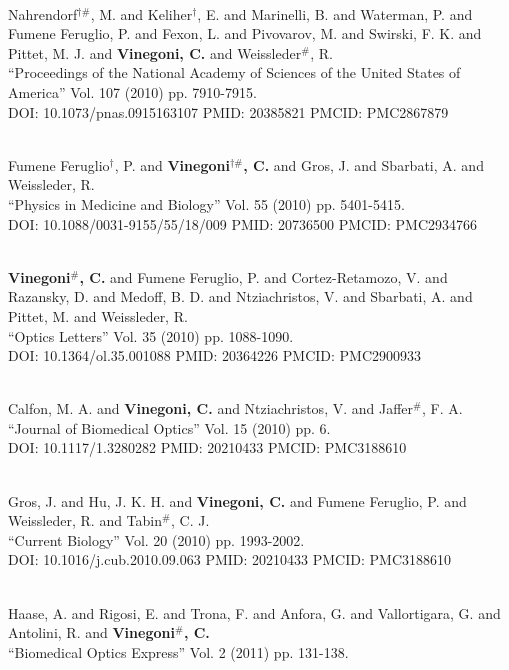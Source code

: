  \\ Nahrendorf$^{\dag \#}$, M. and Keliher$^\dag$, E. and Marinelli, B. and Waterman, P. and Fumene Feruglio, P. and Fexon, L. and Pivovarov, M. and Swirski, F. K. and Pittet, M. J. and {\bf Vinegoni, C.} and Weissleder$^\#$, R. \\ ``Proceedings of the National Academy of Sciences of the United States of America'' Vol. 107 (2010) pp. 7910-7915. \\ DOI: 10.1073/pnas.0915163107 PMID: 20385821 PMCID: PMC2867879\item {} \\ Fumene Feruglio$^\dag$, P. and {\bf Vinegoni$^{\dag \#}$, C.} and Gros, J. and Sbarbati, A. and Weissleder, R. \\ ``Physics in Medicine and Biology'' Vol. 55 (2010) pp. 5401-5415. \\ DOI: 10.1088/0031-9155/55/18/009 PMID: 20736500 PMCID: PMC2934766\item {} \\ {\bf Vinegoni$^\#$, C.} and Fumene Feruglio, P. and Cortez-Retamozo, V. and Razansky, D. and Medoff, B. D. and Ntziachristos, V. and Sbarbati, A. and Pittet, M. and Weissleder, R. \\ ``Optics Letters'' Vol. 35 (2010) pp. 1088-1090. \\ DOI: 10.1364/ol.35.001088 PMID: 20364226 PMCID: PMC2900933\item {} \\ Calfon, M. A. and {\bf Vinegoni, C.} and Ntziachristos, V. and Jaffer$^\#$, F. A. \\ ``Journal of Biomedical Optics'' Vol. 15 (2010) pp. 6. \\ DOI: 10.1117/1.3280282 PMID: 20210433 PMCID: PMC3188610\item {} \\ Gros, J. and Hu, J. K. H. and {\bf Vinegoni, C.} and Fumene Feruglio, P. and Weissleder, R. and Tabin$^\#$, C. J. \\ ``Current Biology'' Vol. 20 (2010) pp. 1993-2002. \\ DOI: 10.1016/j.cub.2010.09.063 PMID: 20210433 PMCID: PMC3188610\item {} \\ Haase, A. and Rigosi, E. and Trona, F. and Anfora, G. and Vallortigara, G. and Antolini, R. and {\bf Vinegoni$^\#$, C.} \\ ``Biomedical Optics Express'' Vol. 2 (2011) pp. 131-138. 